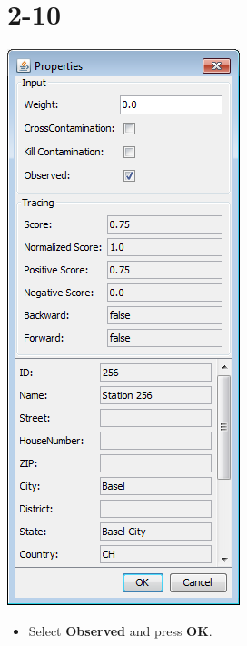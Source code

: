 \documentclass[10pt]{beamer}
\begin{document}
\section{2-10}
\begin{frame}
	\begin{center}
  		\includegraphics[height=0.6\textheight]{2-10.png}
	\end{center}
	\begin{itemize}
		\item Select \textbf{Observed} and press \textbf{OK}.
	\end{itemize}
\end{frame}
\end{document}
